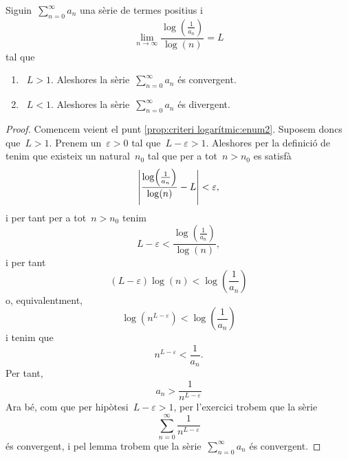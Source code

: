 \documentclass[../../main.tex]{subfiles}
\begin{document}
    \begin{proposition}
        \label{prop:criteri logarítmic}
        Siguin~\(\sum_{n=0}^{\infty}a_{n}\) una sèrie de termes positius i
        \[
            \lim_{n\to\infty}\frac{\log\left(\frac{1}{a_{n}}\right)}{\log(n)}=L
        \]
        tal que
        \begin{enumerate}
            \item\label{prop:criteri logarítmic:enum1}~\(L>1\).
            Aleshores la sèrie~\(\sum_{n=0}^{\infty}a_{n}\) és convergent.
            \item\label{prop:criteri logarítmic:enum2}~\(L<1\).
            Aleshores la sèrie~\(\sum_{n=0}^{\infty}a_{n}\) és divergent.
        \end{enumerate}
        \begin{proof}
            Comencem veient el punt \eqref{prop:criteri logarítmic:enum2}.
            Suposem doncs que~\(L>1\).
            Prenem un~\(\varepsilon>0\) tal que~\(L-\varepsilon>1\).
            Aleshores per la definició de  tenim que existeix un natural~\(n_{0}\) tal que per a tot~\(n>n_{0}\) es satisfà
            \[
                \abs{\frac{\log\left(\frac{1}{a_{n}}\right)}{\log(n)}-L}<\varepsilon,
            \]
            i per tant per a tot~\(n>n_{0}\) tenim
            \[
                L-\varepsilon<\frac{\log\left(\frac{1}{a_{n}}\right)}{\log(n)},
            \]
            i per tant
            \[
                (L-\varepsilon)\log(n)<\log\left(\frac{1}{a_{n}}\right)
            \]
            o, equivalentment,
            \[
                \log\left(n^{L-\varepsilon}\right)<\log\left(\frac{1}{a_{n}}\right)
            \]
            i tenim que %
            \[
                n^{L-\varepsilon}<\frac{1}{a_{n}}.
            \]
            Per tant,
            \[
                a_{n}>\frac{1}{n^{L-\varepsilon}}
            \]
            Ara bé, com que per hipòtesi~\(L-\varepsilon>1\), per l'exercici  trobem que la sèrie
            \[
                \sum_{n=0}^{\infty}\frac{1}{n^{L-\varepsilon}}
            \]
            és convergent, i pel lemma  trobem que la sèrie~\(\sum_{n=0}^{\infty}a_{n}\) és convergent.


\end{proof}
\end{proposition}
\end{document}
